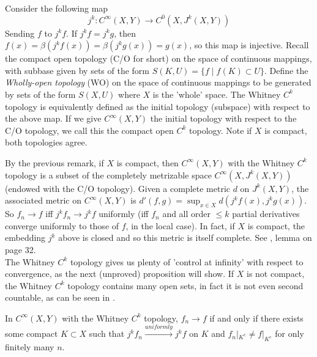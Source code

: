 \documentclass[12pt]{article}
\begin{document}
\begin{remark}
    Consider the following map
    $$
    j^k : C^\infty(X, Y) \to C^0(X, J^k(X, Y))
    $$
    Sending $f$ to $j^k f$. If $j^k f = j^k g$, then $f(x) = \beta (j^k f (x)) = \beta (j^k g(x)) = g(x)$, so this map is injective. Recall the compact open topology (C/O for short) on the space of continuous mappings, with subbase given by sets of the form $S(K, U) = \{ f \mid f(K) \subset U\}$. Define the \emph{Wholly-open topology} (WO) on the space of continuous mappings to be generated by sets of the form $S(X, U)$ where $X$ is the 'whole' space. The Whitney $C^k$ topology is equivalently defined as the initial topology (subspace) with respect to the above map. If we give $C^\infty(X, Y)$ the initial topology with respect to the C/O topology, we call this the compact open $C^k$ topology. Note if $X$ is compact, both topologies agree.  \\
\end{remark}

By the previous remark, if $X$ is compact, then $C^\infty(X, Y)$ with the Whitney $C^k$ topology is a subset of the completely metrizable space $C^\infty(X, J^k(X, Y))$ (endowed with the C/O topology). Given a complete metric $d$ on $J^k(X, Y)$, the associated metric on $C^\infty(X, Y)$ is $d'(f, g) = \sup_{x\in X} d(j^k f (x), j^k g(x))$. So $f_n \to f$ iff $j^k f_n \to j^k f$ uniformly (iff $f_n$ and all order $\leq k$ partial derivatives converge uniformly to those of $f$, in the local case). In fact, if $X$ is compact, the embedding $j^k$ above is closed and so this metric is itself complete. See \cite{UGLYLATEX}, lemma on page 32. \\

The Whitney $C^k$ topology gives us plenty of 'control at infinity' with respect to convergence, as the next (unproved) proposition will show. If $X$ is not compact, the Whitney $C^k$ topology contains many open sets, in fact it is not even second countable, as can be seen in \cite{singularities}. 
\begin{proposition}
    In $C^\infty(X, Y)$ with the Whitney $C^k$ topology, $f_n \to f$ if and only if there exists some compact $K\subset X$ such that $j^k f_n \xrightarrow{uniformly} j^k f$ on $K$ and $f_n|_{K^c} \neq f|_{K^c}$ for only finitely many $n$.  
\end{proposition}
\end{document}
